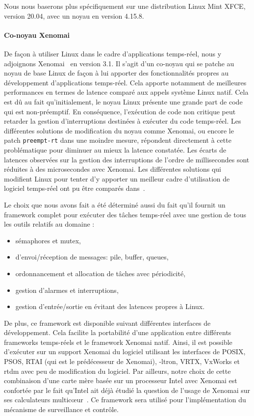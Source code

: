 \documentclass[french, a4paper, 11pt, twoside, pdftex]{StyleThese}
\begin{document}
        Nous nous baserons plus spécifiquement sur une distribution Linux Mint XFCE, version 20.04, avec un noyau en version 4.15.8.
        
        \paragraph{Co-noyau Xenomai}
        De façon à utiliser Linux dans le cadre d'applications temps-réel, nous y adjoignons Xenomai~\cite{gerum_xenomai_2004} en version 3.1. Il s'agit d'un co-noyau qui se patche au noyau de base Linux de façon à lui apporter des fonctionnalités propres au développement d'applications temps-réel. Cela apporte notamment de meilleures performances en termes de latence comparé aux appels système Linux natif. Cela est dû au fait qu'initialement, le noyau Linux présente une grande part de code qui est non-préemptif. En conséquence, l'exécution de code non critique peut retarder la gestion d'interruptions destinées à exécuter du code temps-réel. Les différentes solutions de modification du noyau comme Xenomai, ou encore le patch \texttt{preempt-rt} dans une moindre mesure, répondent directement à cette problématique pour diminuer au mieux la latence constatée. Les écarts de latences observées sur la gestion des interruptions de l'ordre de millisecondes sont réduites à des microsecondes avec Xenomai. Les différentes solutions qui modifient Linux pour tenter d'y apporter un meilleur cadre d'utilisation de logiciel temps-réel ont pu être comparés dans~\cite{brown_how_2010}. 
        
        Le choix que nous avons fait a été déterminé aussi du fait qu'il fournit un framework complet pour exécuter des tâches temps-réel avec une gestion de tous les outils relatifs au domaine : \begin{itemize}
        	\item sémaphores et mutex,
        	\item d'envoi/réception de messages: pile, buffer, queues,
        	\item ordonnancement et allocation de tâches avec périodicité,
        	\item gestion d'alarmes et interruptions,
        	\item gestion d'entrée/sortie en évitant des latences propres à Linux.\end{itemize}
    	De plus, ce framework est disponible suivant différentes interfaces de développement. Cela facilite la portabilité d'une application entre différents frameworks temps-réels et le framework Xenomai natif. Ainsi, il est possible d'exécuter sur un support Xenomai du logiciel utilisant les interfaces de POSIX, PSOS, RTAI (qui est le prédécesseur de Xenomai), \textmu-ltron, VRTX, VxWorks et rtdm avec peu de modification du logiciel. Par ailleurs, notre choix de cette combinaison d'une carte mère basée sur un processeur Intel avec Xenomai est confortée par le fait qu'Intel ait déjà étudié la question de l'usage de Xenomai sur ses calculateurs multicœur~\cite{intel_corporation_hard_2009}. Ce framework sera utilisé pour l'implémentation du mécanisme de surveillance et contrôle.
    	
\end{document}

